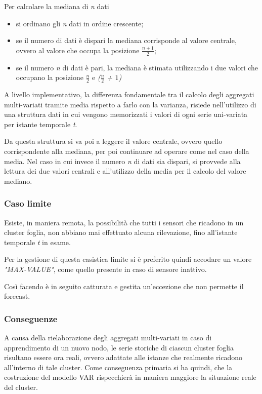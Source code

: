 \documentclass[12pt,a4paper,oneside,openright]{book}
\begin{document}
Per calcolare la mediana di \textit{n} dati \cite{15a} 
\begin{itemize}
\item si ordinano gli \textit{n} dati in ordine crescente;
\item se il numero di dati è dispari la mediana corrisponde al valore centrale, ovvero al valore che occupa la posizione \textbf{$\frac{n+1}{2}$};
\item se il numero \textit{n} di dati è pari, la mediana è stimata utilizzando i due valori che occupano la posizione \textit{$\frac{n}{2}$} e \textit{($\frac{n}{2}$ + $1$)}
\end{itemize}

A livello implementativo, la differenza fondamentale tra il calcolo degli aggregati multi-variati tramite media rispetto a farlo con la varianza, risiede nell'utilizzo di una struttura dati in cui vengono memorizzati i valori di ogni serie uni-variata per istante temporale \textit{t}.

Da questa struttura si va poi a leggere il valore centrale, ovvero quello corrispondente alla mediana, per poi continuare ad operare come nel caso della media. Nel caso in cui invece il numero \textit{n} di dati sia dispari, si provvede alla lettura dei due valori centrali e all'utilizzo della media per il calcolo del valore mediano.

\subsubsection{Caso limite}
Esiste, in maniera remota, la possibilità che tutti i sensori che ricadono in un cluster foglia, non abbiano mai effettuato alcuna rilevazione, fino all'istante temporale \textit{t} in esame. 

Per la gestione di questa casistica limite si è preferito quindi accodare un valore \textit{"MAX-VALUE"}, come quello presente in caso di sensore inattivo.

Così facendo è in seguito catturata e gestita un'eccezione che non permette il forecast.


\subsubsection{Conseguenze}
A causa della rielaborazione degli aggregati multi-variati in caso di apprendimento di un nuovo nodo, le serie storiche di ciascun cluster foglia risultano essere ora reali, ovvero adattate alle istanze che realmente ricadono all'interno di tale cluster. Come conseguenza primaria si ha quindi, che la costruzione del modello VAR rispecchierà in maniera maggiore la situazione reale del cluster.
\end{document}
